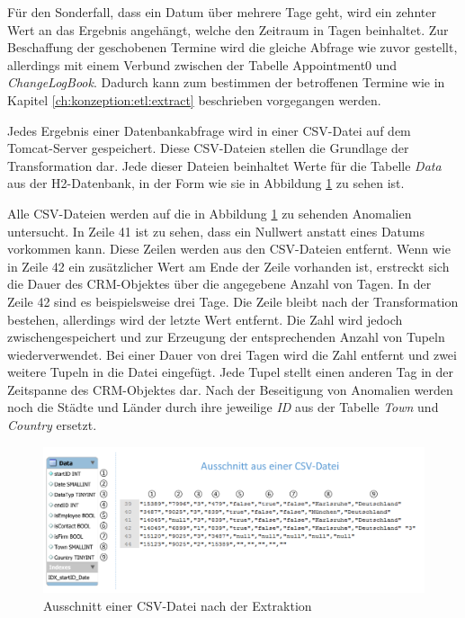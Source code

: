 Für den Sonderfall, dass ein Datum über mehrere Tage geht, wird ein zehnter Wert an das Ergebnis angehängt, welche den Zeitraum in Tagen beinhaltet. Zur Beschaffung der geschobenen Termine wird die gleiche Abfrage wie zuvor gestellt, allerdings mit einem Verbund zwischen der Tabelle Appointment0 und \textit{ChangeLogBook}. Dadurch kann zum bestimmen der betroffenen Termine wie in Kapitel \ref{ch:konzeption:etl:extract} beschrieben vorgegangen werden.

Jedes Ergebnis einer Datenbankabfrage wird in einer CSV-Datei auf dem Tomcat-Server gespeichert. Diese CSV-Dateien stellen die Grundlage der Transformation dar. Jede dieser Dateien beinhaltet Werte für die Tabelle \textit{Data} aus der H2-Datenbank, in der Form wie sie in Abbildung \ref{fig:umsetzung_csv_datei} zu sehen ist. 

Alle CSV-Dateien werden auf die in Abbildung \ref{fig:umsetzung_csv_datei} zu sehenden Anomalien untersucht. In Zeile 41 ist zu sehen, dass ein Nullwert anstatt eines Datums vorkommen kann. Diese Zeilen werden aus den CSV-Dateien entfernt. Wenn wie in Zeile 42 ein zusätzlicher Wert am Ende der Zeile vorhanden ist, erstreckt sich die Dauer des CRM-Objektes über die angegebene Anzahl von Tagen. In der Zeile 42 sind es beispielsweise drei Tage. Die Zeile bleibt nach der Transformation bestehen, allerdings wird der letzte Wert entfernt. Die Zahl wird jedoch zwischengespeichert und zur Erzeugung der entsprechenden Anzahl von Tupeln wiederverwendet. Bei einer Dauer von drei Tagen wird die Zahl entfernt und zwei weitere Tupeln in die Datei eingefügt. Jede Tupel stellt einen anderen Tag in der Zeitspanne des CRM-Objektes dar. Nach der Beseitigung von Anomalien werden noch die Städte und Länder durch ihre jeweilige \textit{ID} aus der Tabelle \textit{Town} und \textit{Country} ersetzt.

\begin{figure}[htbp]
\begin{center}
\includegraphics[width=1.0\textwidth]{pics/umsetzung_transformation.pdf}
\caption{Ausschnitt einer CSV-Datei nach der Extraktion}
\label{fig:umsetzung_csv_datei}
\end{center}
\end{figure}

